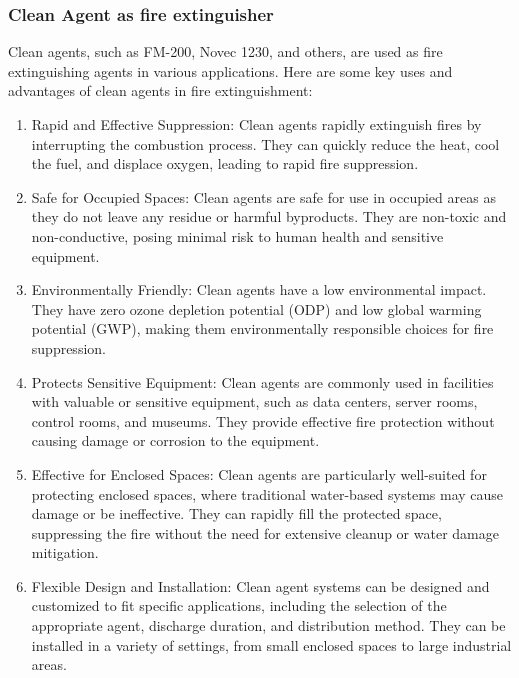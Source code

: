 \documentclass{article}
\begin{document}
\subsubsection*{Clean Agent as fire extinguisher}
Clean agents, such as FM-200, Novec 1230, and others, are used as fire extinguishing agents in various applications. Here are some key uses and advantages of clean agents in fire extinguishment:
\begin{enumerate}
  \item Rapid and Effective Suppression: Clean agents rapidly extinguish fires by interrupting the combustion process. They can quickly reduce the heat, cool the fuel, and displace oxygen, leading to rapid fire suppression.
  \item Safe for Occupied Spaces: Clean agents are safe for use in occupied areas as they do not leave any residue or harmful byproducts. They are non-toxic and non-conductive, posing minimal risk to human health and sensitive equipment.
  \item Environmentally Friendly: Clean agents have a low environmental impact. They have zero ozone depletion potential (ODP) and low global warming potential (GWP), making them environmentally responsible choices for fire suppression.
  \item Protects Sensitive Equipment: Clean agents are commonly used in facilities with valuable or sensitive equipment, such as data centers, server rooms, control rooms, and museums. They provide effective fire protection without causing damage or corrosion to the equipment.
  \item Effective for Enclosed Spaces: Clean agents are particularly well-suited for protecting enclosed spaces, where traditional water-based systems may cause damage or be ineffective. They can rapidly fill the protected space, suppressing the fire without the need for extensive cleanup or water damage mitigation.
  \item Flexible Design and Installation: Clean agent systems can be designed and customized to fit specific applications, including the selection of the appropriate agent, discharge duration, and distribution method. They can be installed in a variety of settings, from small enclosed spaces to large industrial areas.
\end{enumerate}
\end{document}

